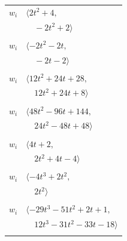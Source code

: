 \documentclass[11pt]{article}
\begin{document}
\begin{longtable}{@{}ll@{}}
$w_i$ & $\langle 2t^{2}+4,$\\
 & $\quad -2t^{2}+2\rangle$\\
\addlinespace[2pt]
\multicolumn{2}{@{}p{0.97\textwidth}@{}}{$i=11$, $D_i=1$, $\rho_{ij}$: $1{:}1, \allowbreak 2{:}2, \allowbreak 18{:}1, \allowbreak 20{:}2, \allowbreak 21{:}2, \allowbreak 24{:}2, \allowbreak 27{:}1$}\\
$w_i$ & $\langle -2t^{2}-2t,$\\
 & $\quad -2t-2\rangle$\\
\addlinespace[2pt]
\multicolumn{2}{@{}p{0.97\textwidth}@{}}{$i=12$, $D_i=4$, $\rho_{ij}$: $1{:}2, \allowbreak 6{:}2, \allowbreak 23{:}1, \allowbreak 25{:}2, \allowbreak 26{:}2, \allowbreak 30{:}2$}\\
$w_i$ & $\langle 12t^{2}+24t+28,$\\
 & $\quad 12t^{2}+24t+8\rangle$\\
\addlinespace[2pt]
\multicolumn{2}{@{}p{0.97\textwidth}@{}}{$i=13$, $D_i=4$, $\rho_{ij}$: $2{:}2, \allowbreak 8{:}2, \allowbreak 18{:}2, \allowbreak 21{:}2, \allowbreak 22{:}2, \allowbreak 25{:}1, \allowbreak 26{:}2$}\\
$w_i$ & $\langle 48t^{2}-96t+144,$\\
 & $\quad 24t^{2}-48t+48\rangle$\\
\addlinespace[2pt]
\multicolumn{2}{@{}p{0.97\textwidth}@{}}{$i=14$, $D_i=2$, $\rho_{ij}$: $5{:}1, \allowbreak 7{:}2, \allowbreak 15{:}2, \allowbreak 21{:}2, \allowbreak 22{:}1, \allowbreak 26{:}1$}\\
$w_i$ & $\langle 4t+2,$\\
 & $\quad 2t^{2}+4t-4\rangle$\\
\addlinespace[2pt]
\multicolumn{2}{@{}p{0.97\textwidth}@{}}{$i=15$, $D_i=2$, $\rho_{ij}$: $0{:}2, \allowbreak 8{:}1, \allowbreak 10{:}1, \allowbreak 14{:}1, \allowbreak 22{:}2, \allowbreak 27{:}1$}\\
$w_i$ & $\langle -4t^{3}+2t^{2},$\\
 & $\quad 2t^{2}\rangle$\\
\addlinespace[2pt]
\multicolumn{2}{@{}p{0.97\textwidth}@{}}{$i=16$, $D_i=4$, $\rho_{ij}$: $3{:}2, \allowbreak 5{:}2, \allowbreak 7{:}1, \allowbreak 21{:}2, \allowbreak 25{:}1, \allowbreak 26{:}1, \allowbreak 27{:}2, \allowbreak 28{:}2, \allowbreak 29{:}2$}\\
$w_i$ & $\langle -29t^{3}-51t^{2}+2t+1,$\\
 & $\quad 12t^{3}-31t^{2}-33t-18\rangle$\\
\addlinespace[2pt]
\multicolumn{2}{@{}p{0.97\textwidth}@{}}{$i=17$, $D_i=160$, $\rho_{ij}$: $2{:}2, \allowbreak 4{:}2, \allowbreak 6{:}1, \allowbreak 7{:}2, \allowbreak 8{:}1, \allowbreak 19{:}2, \allowbreak 20{:}2, \allowbreak 21{:}1, \allowbreak 22{:}2, \allowbreak 30{:}2$}\\

\end{longtable}
\end{document}
